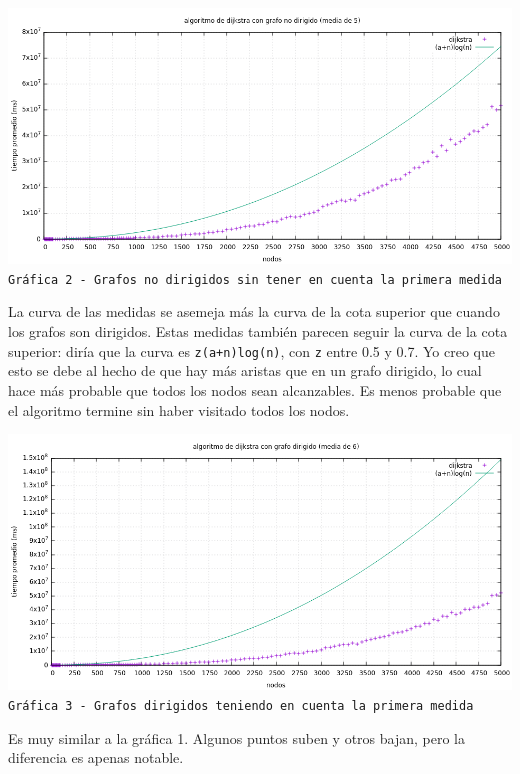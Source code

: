 \documentclass[12pt , a4paper]{article}
\begin{document}
	
	\newpage
	\hspace*{-.15\linewidth}
	\includegraphics[width=1.25\hsize]{nodir5.png}
	\texttt{Gráfica 2 - Grafos no dirigidos sin tener en cuenta la primera medida}
	\newline	
	
	La curva de las medidas se asemeja más la curva de la cota superior que cuando los grafos son dirigidos. Estas medidas también parecen seguir la curva de la cota superior: diría que la curva es \texttt{z(a+n)log(n)}, con \texttt{z} entre 0.5 y 0.7.  Yo creo que esto se debe al hecho de que hay más aristas que en un grafo dirigido, lo cual hace más probable que todos los nodos sean alcanzables. Es menos probable que el algoritmo termine sin haber visitado todos los nodos.


	\newpage
	\hspace*{-.15\linewidth}
	\includegraphics[width=1.25\hsize]{dir6.png}
	\texttt{Gráfica 3 - Grafos dirigidos teniendo en cuenta la primera medida}
	\newline
	
	Es muy similar a la gráfica 1. Algunos puntos suben y otros bajan, pero la diferencia es apenas notable.
	
\end{document}
